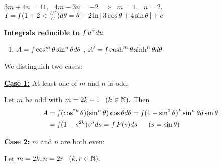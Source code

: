 \documentclass[11pt]{amsbook}
\begin{document}

	\begin{center}
		$3m + 4n = 11 , \hspace{8pt}4m-3n = -2 \hspace{6pt}  \Rightarrow  \hspace{6pt}  m=1, \hspace{8pt}   n=2.$\\[4pt]
		$I = \smallint_{}^{}(1+2<\frac{U'}{U})d\theta = \theta + 2 \ln\left \lvert \, 3 \cos{\theta} + 4 \sin{\theta}  \, \right \rvert+c$\\[4pt]
	\end{center}

	\textbf{\underline{Integrals reducible to $\smallint u^{\alpha}du $}}


	\begin{enumerate}[label=1.]
	
		\item {$A = \smallint \cos^{m}\theta \sin^{n}\theta d\theta$} ,  $A' = \smallint \cosh^{m}\theta \sinh^{n}\theta d\theta $

	\end{enumerate}

		We distinguish two cases:

	\textbf{\underline{Case 1:}} At least one of $m$ and $n$ is odd:

	

		Let $m$ be odd with $m = 2k+1 \hspace{8pt}(k \in \mathbb{N}).$ Then
	\begin{align*}
		A &
		= \smallint(\cos^{2k}\theta)(\sin^{n}\theta)\cos\theta d\theta = \smallint (1-\sin^2 \theta)^k \sin^n \theta d\sin\theta\\
		&=\smallint(1-s^{2k}) s^n ds = \smallint P(s)ds \hspace{16pt} (s = \sin\theta)
	\end{align*}

	
	\textbf{\underline{Case 2:}}
	$m$ and $n$ are both even:

	Let  $m = 2k,  n = 2r \hspace{8pt}(k,r \in \mathbb{N}).$
	
\end{document}
